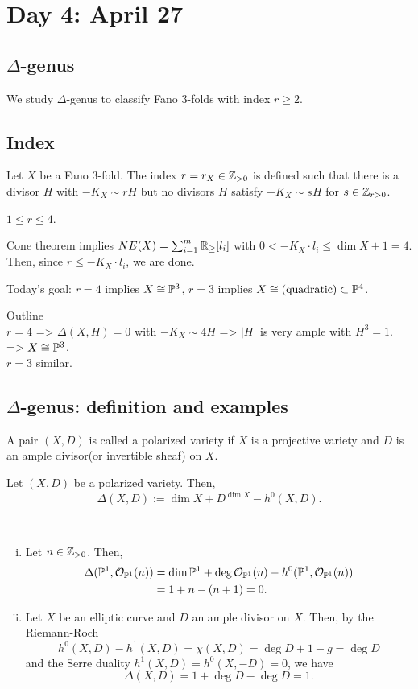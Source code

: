 \documentclass{../../small}
\begin{document}
\newpage
\section{Day 4: April 27}
\subsection*{$\Delta$-genus}

We study $\Delta$-genus to classify Fano 3-folds with index $r\ge2$.

\subsection{Index}

\begin{defn}
Let $X$ be a Fano 3-fold.
The index $r=r_X\in\Z_{>0}$ is defined such that there is a divisor $H$ with $-K_X\sim rH$ but no divisors $H$ satisfy $-K_X\sim sH$ for $s\in\Z_{r>0}$.
\end{defn}
\begin{lem}
$1\le r\le 4$.
\end{lem}
\begin{pf}
Cone theorem implies $NE(X)=\sum_{i=1}^m\R_{\ge}[l_i]$
with $0<-K_X\cdot l_i\le\dim X+1=4$.
Then, since $r\le-K_X\cdot l_i$, we are done.
\end{pf}

Today's goal: $r=4$ implies $X\cong\P^3$, $r=3$ implies $X\cong\text{(quadratic)}\subset\P^4$.

Outline\\
$r=4$ => $\Delta(X,H)=0$ with $-K_X\sim4H$ => $|H|$ is very ample with $H^3=1$. => $X\cong\P^3$.\\
$r=3$ similar.

\subsection{$\Delta$-genus: definition and examples}
\begin{defn}
A pair $(X,D)$ is called a polarized variety if $X$ is a projective variety and $D$ is an ample divisor(or invertible sheaf) on $X$.
\end{defn}
\begin{defn}
Let $(X,D)$ be a polarized variety.
Then,
\[\Delta(X,D):=\dim X+D^{\dim X}-h^0(X,D).\]
\end{defn}
\begin{ex}\,
\begin{enumerate}[(i)]
\item
Let $n\in\Z_{>0}$.
Then,
\begin{align*}
\Delta(\P^1,\cO_{\P^1}(n))&=\dim\P^1+\deg\cO_{\P^1}(n)-h^0(\P^1,\cO_{\P^1}(n))\\&=1+n-(n+1)=0.\end{align*}
\item
Let $X$ be an elliptic curve and $D$ an ample divisor on $X$.
Then, by the Riemann-Roch
\[h^0(X,D)-h^1(X,D)=\chi(X,D)=\deg D+1-g=\deg D\]
and the Serre duality $h^1(X,D)=h^0(X,-D)=0$, we have
\[\Delta(X,D)=1+\deg D-\deg D=1.\]
\end{enumerate}
\end{ex}
\end{document}
